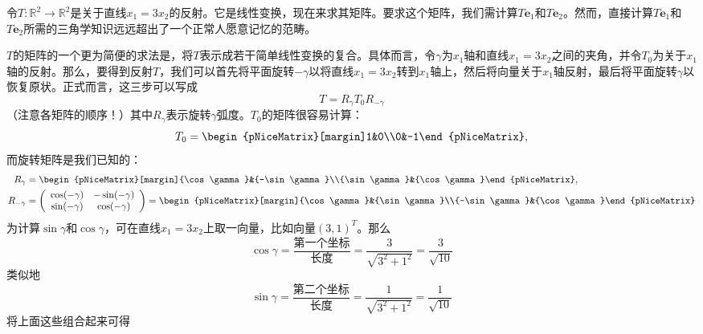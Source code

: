 \begin{example*}
    令$T:\mathbb{R}^{2}\to\mathbb{R}^{2}$是关于直线$x_1=3x_2$的反射。它是线性变换，现在来求其矩阵。要求这个矩阵，我们需计算$T\mathbf{e}_{1}$和$T\mathbf{e}_{2}$。然而，直接计算$T\mathbf{e}_{1}$和$T\mathbf{e}_{2}$所需的三角学知识远远超出了一个正常人愿意记忆的范畴。

    $T$的矩阵的一个更为简便的求法是，将$T$表示成若干简单线性变换的复合。具体而言，令$\gamma$为$x_1$轴和直线$x_1=3x_2$之间的夹角，并令$T_0$为关于$x_1$轴的反射。那么，要得到反射$T$，我们可以首先将平面旋转$-\gamma$以将直线$x_1=3x_2$转到$x_1$轴上，然后将向量关于$x_1$轴反射，最后将平面旋转$\gamma$以恢复原状。正式而言，这三步可以写成
    \[T=R_\gamma T_0R_{-\gamma}\]
    （注意各矩阵的顺序！）其中$R_\gamma$表示旋转$\gamma$弧度。$T_0$的矩阵很容易计算：
\[T_0=\begin{pNiceMatrix}[margin]1&0\\0&-1\end{pNiceMatrix},\]
而旋转矩阵是我们已知的：
\[\begin{aligned}
    R_{\gamma}&=\begin{pNiceMatrix}[margin]{\cos\gamma}&{-\sin\gamma}\\{\sin\gamma}&{\cos\gamma}\end{pNiceMatrix},\\
    R_{-\gamma}&=\left(\begin{array}{cc}{\cos(-\gamma)}&{-\sin(-\gamma)}\\{\sin(-\gamma)}&{\cos(-\gamma)}\end{array}\right)=\begin{pNiceMatrix}[margin]{\cos\gamma}&{\sin\gamma}\\{-\sin\gamma}&{\cos\gamma}\end{pNiceMatrix}\end{aligned}
\]
为计算$\sin\gamma$和$\cos\gamma$，可在直线$x_1=3x_2$上取一向量，比如向量$(3,1)^T$。那么\[\cos\gamma=\frac{\text{第一个坐标}}{\text{长度}}=\frac{3}{\sqrt{3^2+1^2}}=\frac{3}{\sqrt{10}}\]
类似地\[\sin\gamma=\frac{\text{第二个坐标}}{\text{长度}}=\frac{1}{\sqrt{3^2+1^2}}=\frac{1}{\sqrt{10}}\]
将上面这些组合起来可得

\end{example*}
